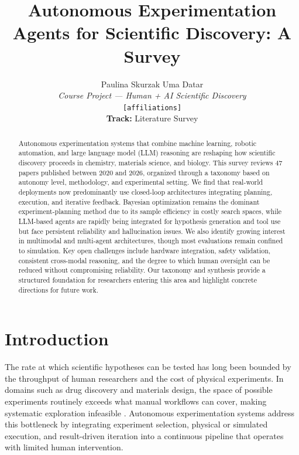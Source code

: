 \documentclass{article}
\title{Autonomous Experimentation Agents for Scientific Discovery: A Survey}
\author{
  Paulina Skurzak \quad Uma Datar \\
  \textit{Course Project — Human + AI Scientific Discovery} \\
  \texttt{[affiliations]} \\
  \textbf{Track:} Literature Survey
}
\begin{document}
\maketitle

\begin{abstract}
Autonomous experimentation systems that combine machine learning, robotic automation, and large language model (LLM) reasoning are reshaping how scientific discovery proceeds in chemistry, materials science, and biology. This survey reviews 47 papers published between 2020 and 2026, organized through a taxonomy based on autonomy level, methodology, and experimental setting. We find that real-world deployments now predominantly use closed-loop architectures integrating planning, execution, and iterative feedback. Bayesian optimization remains the dominant experiment-planning method due to its sample efficiency in costly search spaces, while LLM-based agents are rapidly being integrated for hypothesis generation and tool use but face persistent reliability and hallucination issues. We also identify growing interest in multimodal and multi-agent architectures, though most evaluations remain confined to simulation. Key open challenges include hardware integration, safety validation, consistent cross-modal reasoning, and the degree to which human oversight can be reduced without compromising reliability. Our taxonomy and synthesis provide a structured foundation for researchers entering this area and highlight concrete directions for future work.
\end{abstract}

\section{Introduction}

The rate at which scientific hypotheses can be tested has long been bounded by the throughput of human researchers and the cost of physical experiments. In domains such as drug discovery and materials design, the space of possible experiments routinely exceeds what manual workflows can cover, making systematic exploration infeasible \cite{reker2015active, pyzer2018bayesian}. Autonomous experimentation systems address this bottleneck by integrating experiment selection, physical or simulated execution, and result-driven iteration into a continuous pipeline that operates with limited human intervention.
\end{document}
